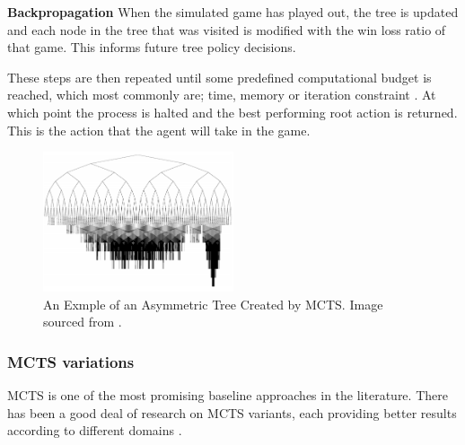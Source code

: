 \documentclass[journal]{IEEEtran}
\begin{document}
		\textbf{Backpropagation}
			When the simulated game has played out, the tree is updated and each node in the tree that was visited is modified with the win loss ratio of that game. This informs future tree policy decisions.
			
			These steps are then repeated until some predefined computational budget is reached, which most commonly are; time, memory or iteration constraint \cite{browne2012survey}. At which point the process is halted and the best performing root action is returned. This is the action that the agent will take in the game.


		
		\begin{figure}[h]
		    \centering
		    \includegraphics[width=0.5\textwidth]{MCTSasymmetry}
		    \caption{An Exmple of an Asymmetric Tree Created by MCTS. Image sourced from \cite{coquelin2007bandit}. }
		    \label{fig:MCTS1}
		\end{figure}




		\subsubsection{MCTS variations} \label{sssec:MCTSvariations}
			MCTS is one of the most promising baseline approaches in the  literature.
			There has been a good deal of research on MCTS variants, each providing better results according to different domains \cite{browne2012survey, park2015mcts, perez2014knowledge, ilhan2017monte, de2016monte, frydenberg2015investigating}.
\end{document}
